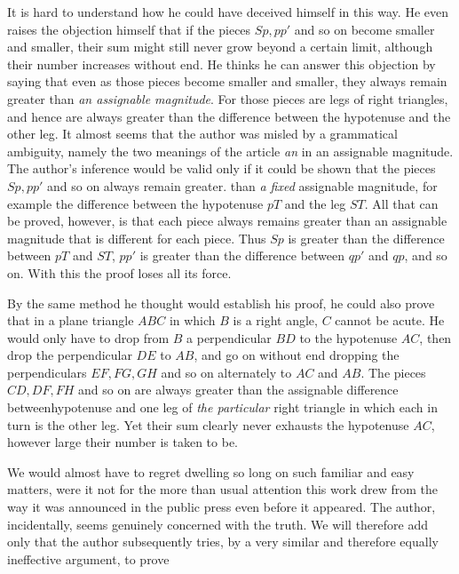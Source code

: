 %
It is hard to understand how he could have deceived himself in this way. He even raises the objection himself that if the pieces \(Sp,pp'\) and so on become smaller and smaller, their sum might still never grow beyond a certain limit, although their number increases without end. He thinks he can answer this objection by saying that even as those pieces become smaller and smaller, they always remain greater than \textit{an assignable magnitude}. For those pieces are legs of right triangles, and hence are always greater than the difference between the hypotenuse and the other leg. It almost seems that the author was misled by a grammatical ambiguity, namely the two meanings of the article \textit{an} in an assignable magnitude. The author's inference would be valid only if it could be shown that the pieces \(Sp,pp'\) and so on always remain greater. than \textit{a fixed} assignable magnitude, for example the difference between the hypotenuse \(pT\) and the leg \(ST\). All that can be proved, however, is that each piece always remains greater than an assignable magnitude that is different for each piece. Thus \(Sp\) is greater than the difference between \(pT\) and \(ST\), \(pp'\) is greater than the difference between \(qp'\) and \(qp\), and so on. With this the proof loses all its force.

By the same method he thought would establish his proof, he could also prove that in a plane triangle \(ABC\) in which \(B\) is a right angle, \(C\) cannot be acute. He would only have to drop from \(B\) a perpendicular \(BD\) to the hypotenuse \(AC\), then drop the perpendicular \(DE\) to \(AB\), and go on without end dropping the perpendiculars \(EF,FG,GH\) and so on alternately to \(AC\) and \(AB\). The pieces \(CD,DF,FH\) and so on are always greater than the assignable difference betweenhypotenuse and one leg of \textit{the particular} right triangle in which each in turn is the other leg. Yet their sum clearly never exhausts the hypotenuse \(AC\), however large their number is taken to be.

We would almost have to regret dwelling so long on such familiar and easy matters, were it not for the more than usual attention this work drew from the way it was announced in the public press even before it appeared. The author, incidentally, seems genuinely concerned with the truth. We will therefore add only that the author subsequently tries, by a very similar and therefore equally ineffective argument, to prove %
